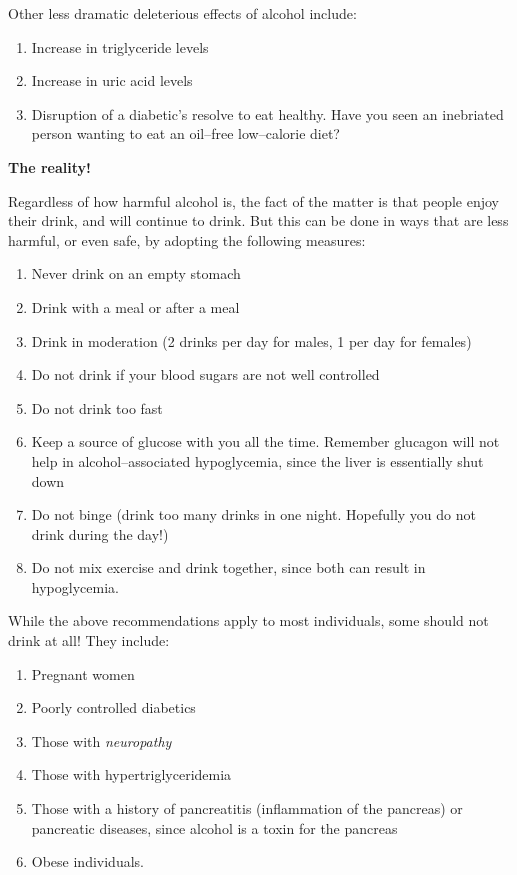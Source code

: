 \noindent Other less dramatic deleterious effects of alcohol include:

\begin{enumerate}[•]
\itemsep=0pt
\item Increase in triglyceride levels
\item Increase in uric acid levels
\item Disruption of a diabetic’s resolve to eat healthy. Have you seen an inebriated person wanting to eat an oil–free low–calorie diet?
\end{enumerate}

\noindent\textbf{The reality!}

Regardless of how harmful alcohol is, the fact of the matter is that people enjoy their drink, and will continue to drink. But this can be done in ways that are less harmful, or even safe, by adopting the following measures:

\begin{enumerate}[•]
\itemsep=0pt
\item Never drink on an empty stomach
\item Drink with a meal or after a meal
\item Drink in moderation (2 drinks per day for males, 1 per day for females)
\item Do not drink if your blood sugars are not well controlled
\item Do not drink too fast
\item Keep a source of glucose with you all the time. Remember glucagon will not help in alcohol–associated hypoglycemia, since the liver is essentially shut down
\item Do not binge (drink too many drinks in one night. Hopefully you do not drink during the day!)
\item Do not mix exercise and drink together, since both can result in hypoglycemia.
\end{enumerate}

While the above recommendations apply to most individuals, some should not drink at all! They include:

\begin{enumerate}[•]
\itemsep=0pt
\item Pregnant women
\item Poorly controlled diabetics
\item Those with \textit{neuropathy}
\item Those with hypertriglyceridemia
\item Those with a history of pancreatitis (inflammation of the pancreas) or pancreatic diseases, since alcohol is a toxin for the pancreas
\item Obese individuals.
\end{enumerate}

